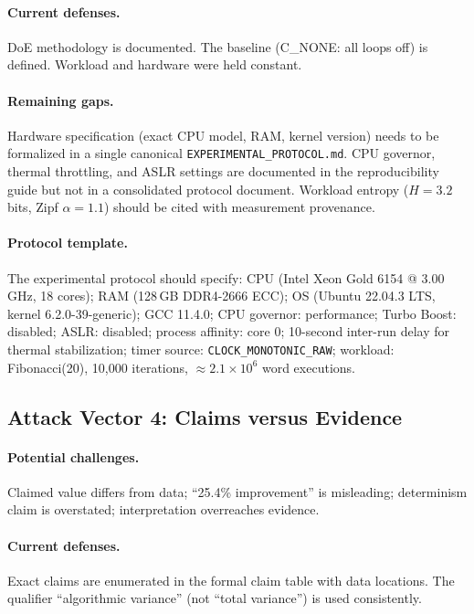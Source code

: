 \paragraph{Current defenses.}
DoE methodology is documented. The baseline (C\_NONE: all loops off) is
defined. Workload and hardware were held constant.

\paragraph{Remaining gaps.}
Hardware specification (exact CPU model, RAM, kernel version) needs to be
formalized in a single canonical \texttt{EXPERIMENTAL\_PROTOCOL.md}. CPU
governor, thermal throttling, and ASLR settings are documented in the
reproducibility guide but not in a consolidated protocol document. Workload
entropy ($H = 3.2$\,bits, Zipf $\alpha = 1.1$) should be cited with
measurement provenance.

\paragraph{Protocol template.}
The experimental protocol should specify: CPU (Intel Xeon Gold 6154 @
3.00\,GHz, 18 cores); RAM (128\,GB DDR4-2666 ECC); OS (Ubuntu 22.04.3 LTS,
kernel 6.2.0-39-generic); GCC 11.4.0; CPU governor: performance; Turbo
Boost: disabled; ASLR: disabled; process affinity: core 0; 10-second
inter-run delay for thermal stabilization; timer source:
\texttt{CLOCK\_MONOTONIC\_RAW}; workload: Fibonacci(20), 10{,}000 iterations,
$\approx 2.1 \times 10^6$ word executions.

\subsection{Attack Vector 4: Claims versus Evidence}

\paragraph{Potential challenges.}
Claimed value differs from data; ``25.4\% improvement'' is misleading;
determinism claim is overstated; interpretation overreaches evidence.

\paragraph{Current defenses.}
Exact claims are enumerated in the formal claim table with data locations.
The qualifier ``algorithmic variance'' (not ``total variance'') is used
consistently.

